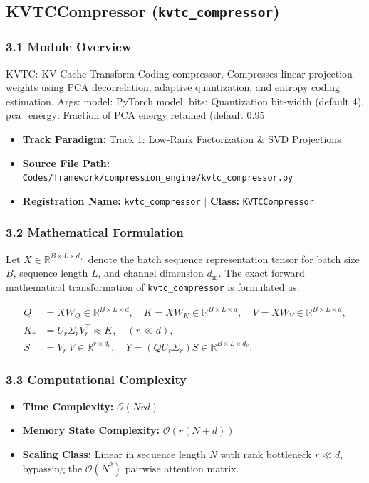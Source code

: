 \subsection{KVTCCompressor (\texttt{kvtc\_compressor})}
\label{sec:app_module_kvtc_compressor}

\subsubsection*{3.1 Module Overview}
KVTC: KV Cache Transform Coding compressor. Compresses linear projection weights using PCA decorrelation, adaptive quantization, and entropy coding estimation.  Args:     model: PyTorch model.     bits: Quantization bit-width (default 4).     pca\_energy: Fraction of PCA energy retained (default 0.95
\begin{itemize}
    \item \textbf{Track Paradigm:} Track 1: Low-Rank Factorization & SVD Projections
    \item \textbf{Source File Path:} \texttt{Codes/framework/compression\_engine/kvtc\_compressor.py}
    \item \textbf{Registration Name:} \texttt{kvtc\_compressor} $\mid$ \textbf{Class:} \texttt{KVTCCompressor}
\end{itemize}

\subsubsection*{3.2 Mathematical Formulation}
Let $X \in \mathbb{R}^{B \times L \times d_{\text{in}}}$ denote the batch sequence representation tensor for batch size $B$, sequence length $L$, and channel dimension $d_{\text{in}}$. The exact forward mathematical transformation of \texttt{kvtc\_compressor} is formulated as:

\begin{align}
Q &= X W_Q \in \mathbb{R}^{B \times L \times d}, \quad K = X W_K \in \mathbb{R}^{B \times L \times d}, \quad V = X W_V \in \mathbb{R}^{B \times L \times d}, \\
K_r &= U_r \Sigma_r V_r^\top \approx K, \quad (r \ll d), \\
S &= V_r^\top V \in \mathbb{R}^{r \times d_v}, \quad Y = (Q U_r \Sigma_r) S \in \mathbb{R}^{B \times L \times d_v}.
\end{align}


\subsubsection*{3.3 Computational Complexity}
\begin{itemize}
    \item \textbf{Time Complexity:} $\mathcal{O}(N r d)$
    \item \textbf{Memory State Complexity:} $\mathcal{O}(r(N + d))$
    \item \textbf{Scaling Class:} Linear in sequence length $N$ with rank bottleneck $r \ll d$, bypassing the $\mathcal{O}(N^2)$ pairwise attention matrix.
\end{itemize}

